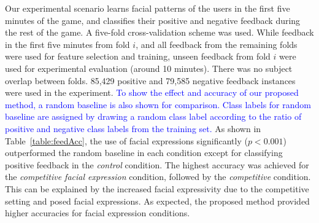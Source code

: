 Our experimental scenario learns facial patterns of the
users in the first five minutes of the game, and classifies their
positive and negative feedback during the rest of the game. A five-fold cross-validation scheme was used. While
feedback in the first five minutes from fold $i$, and all
feedback from the remaining folds were used for feature
selection and training, unseen feedback from fold $i$ were
used for experimental evaluation (around 10 minutes). There was no subject overlap between
folds. %
85,429 positive and 79,585
negative feedback instances were used in the experiment.
 \textcolor{blue}{To show the effect and accuracy of our proposed method, a random baseline is also shown for comparison. 
Class labels for random baseline are assigned by drawing a random class label according to the ratio of positive and negative class labels from the training set.}
As shown in
Table~\ref{table:feedAcc}, the use of facial expressions
significantly ($p<0.001$) outperformed the random baseline in each
condition except for classifying positive feedback in the 
\emph{control} condition. The highest accuracy was achieved for the
\emph{competitive facial expression} condition, followed by the
\emph{competitive} condition. This can be explained by the
increased facial expressivity due to the competitive setting and posed facial expressions. As
expected, the proposed method provided higher accuracies for
facial expression conditions.



%


